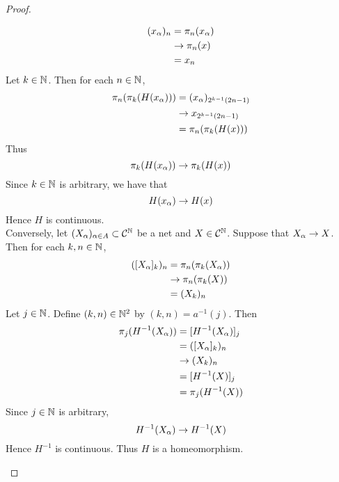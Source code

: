 \documentclass{book}
\begin{document}
\begin{proof}
\begin{enumerate}
\begin{align*}
				(x_{\alpha})_n
				& = \pi_n(x_{\alpha}) \\
				& \rightarrow \pi_n(x) \\
				& = x_n 
			\end{align*}
			Let $k \in \mathbb{N}$. Then for each $n \in \mathbb{N}$,
			\begin{align*}
				\pi_{n}(\pi_k(H(x_{\alpha})))
				& = (x_{\alpha})_{ 2^{k-1}(2n -1)} \\
				& \rightarrow x_{2^{k-1}(2n -1)} \\
				& = \pi_n(\pi_k(H(x)))
			\end{align*}
			Thus 
			$$\pi_k(H(x_{\alpha})) \rightarrow \pi_k(H(x))$$
			Since $k \in \mathbb{N}$ is arbitrary, we have that 
			$$H(x_{\alpha}) \rightarrow H(x)$$
			Hence $H$ is continuous. \\
			Conversely, let $(X_{\alpha})_{\alpha \in A} \subset \mathcal{C}^{\mathbb{N}}$ be a net and $X \in \mathcal{C}^{\mathbb{N}}$. Suppose that $X_{\alpha} \rightarrow X$. Then for each $k, n \in \mathbb{N}$, 
			\begin{align*}
				([X_{\alpha}]_k)_n  
				& = \pi_n(\pi_k(X_{\alpha})) \\
				& \rightarrow \pi_n(\pi_k(X)) \\ 
				& = (X_k)_n
			\end{align*}
			Let $j \in \mathbb{N}$. Define $(k,n) \in \mathbb{N}^2$ by $(k,n) = a^{-1}(j)$. Then 
			\begin{align*}
				\pi_j(H^{-1}(X_{\alpha}))
				& = [H^{-1}(X_{\alpha})]_j \\
				& = ([X_{\alpha}]_k)_n \\
				& \rightarrow (X_k)_n \\
				& = [H^{-1}(X)]_j \\
				& = \pi_j(H^{-1}(X))
			\end{align*}
			Since $j \in \mathbb{N}$ is arbitrary, 
			$$H^{-1}(X_{\alpha}) \rightarrow H^{-1}(X)$$
			Hence $H^{-1}$ is continuous. Thus $H$ is a homeomorphism.
		\end{enumerate}
	\end{proof}
\end{document}
